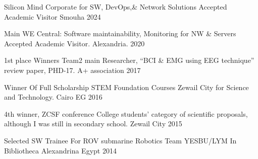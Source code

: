 


\begin{cvhonors}

  \cvhonor
    {Silicon Mind Corporate for SW, DevOps,\& Network Solutions} %
    {Accepted Academic Visitor} %
    {Smouha} %
    {2024} %

  \cvhonor
    {Main WE Central: Software maintainability, Monitoring for NW \& Servers} %
    {Accepted Academic Visitor.} %
    { Alexandria.} %
    {2020} %


  \cvhonor
    { 1st place Winners} %
    {Team2 main Researcher, “BCI \& EMG using EEG technique” review paper, PHD-17.} %
    {A+ association} %
    {2017} %


  \cvhonor
  {Winner Of Full Scholarship STEM Foundation Courses } %
  {Zewail City for Science and Technology.} %
  {Cairo EG} %
  {2016} %

  \cvhonor
  {4th winner, ZCSF conference } %
  {\scriptsize College students’ category of scientific proposals, although I was still in secondary school.} %
  {Zewail City} %
  {2015} %

    \cvhonor
      {Selected SW Trainee For ROV submarine Robotics Team} %
      {YESBU/LYM In Bibliotheca Alexandrina} %
      {Egypt} %
      {2014} %

\end{cvhonors}
